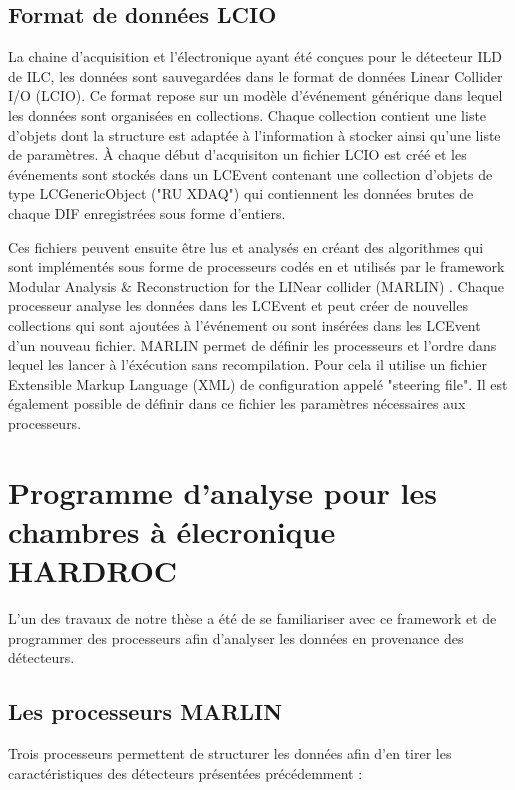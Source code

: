\subsection{Format de données LCIO}
La chaine d'acquisition et l'électronique ayant été conçues pour le détecteur ILD de ILC, les données sont sauvegardées dans le format de données Linear Collider I/O (LCIO)\cite{2003physics6114G}. Ce format repose sur un modèle d'événement générique  dans lequel les données sont organisées en collections. Chaque collection contient une liste d'objets dont la structure est adaptée à l'information à stocker ainsi qu'une liste de paramètres. À chaque début d'acquisiton un fichier LCIO est créé et les événements sont stockés dans un LCEvent contenant une collection d'objets de type LCGenericObject ("RU XDAQ") qui contiennent les données brutes de chaque DIF enregistrées sous forme d'entiers.

Ces fichiers peuvent ensuite être lus et analysés en créant des algorithmes qui sont implémentés sous forme de processeurs codés en \Cpp et utilisés par le framework Modular Analysis \& Reconstruction for the LINear collider (MARLIN) \cite{Gaede:2006pj}. Chaque processeur analyse les données dans les LCEvent et peut créer de nouvelles collections qui sont ajoutées à l'événement ou sont insérées dans les LCEvent d'un nouveau fichier. MARLIN permet de définir les processeurs et l'ordre dans lequel les lancer à l'éxécution sans recompilation. Pour cela il utilise un fichier Extensible Markup Language (XML) de configuration appelé "steering file". Il est également possible de définir dans ce fichier les paramètres nécessaires aux processeurs.

\section{Programme d'analyse pour les chambres à élecronique HARDROC}
L'un des travaux de notre thèse a été de se familiariser avec ce framework et de programmer des processeurs afin d'analyser les données en provenance des détecteurs. 

\subsection{Les processeurs MARLIN}
Trois processeurs permettent de structurer les données afin d'en tirer les caractéristiques des détecteurs présentées précédemment :

